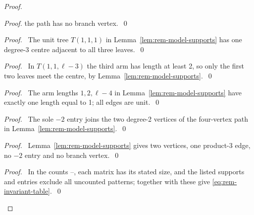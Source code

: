 \begin{proof}
\begin{proof}
the path has no branch vertex.~\qed\end{proof}
\begin{proof}\pf\ The unit tree $T(1,1,1)$ in
Lemma~\ref{lem:rem-model-supports} has one degree-3 centre adjacent
to all three leaves.~\qed\end{proof}
\begin{proof}\pf\ In $T(1,1,\ell-3)$ the third arm has length at least 2,
so only the first two leaves meet the centre, by
Lemma~\ref{lem:rem-model-supports}.~\qed\end{proof}
\begin{proof}\pf\ The arm lengths $1,2,\ell-4$ in
Lemma~\ref{lem:rem-model-supports} have exactly one length equal to 1;
all edges are unit.~\qed\end{proof}
\begin{proof}\pf\ The sole $-2$ entry joins the two degree-2 vertices
of the four-vertex path in Lemma~\ref{lem:rem-model-supports}.~\qed\end{proof}
\begin{proof}\pf\ Lemma~\ref{lem:rem-model-supports} gives two vertices,
one product-3 edge, no $-2$ entry and no branch vertex.~\qed\end{proof}
\qedstep
\begin{proof}\pf\ In the counts --, each
matrix has its stated size, and the listed supports and entries
exclude all uncounted patterns; together with 
these give \eqref{eq:rem-invariant-table}.~\qed\end{proof}
\end{proof}


